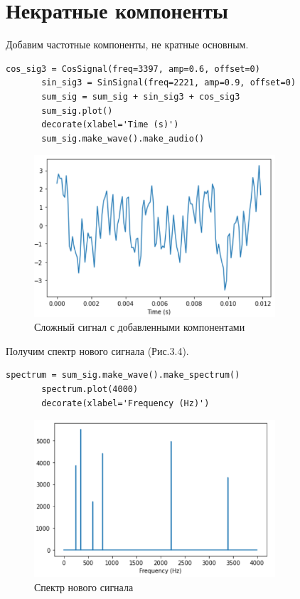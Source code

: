 \documentclass[a4paper,12pt]{report}
\begin{document}
\section{Некратные компоненты}
    Добавим частотные компоненты, не кратные основным.
\begin{lstlisting}[caption=Добавление новых компонентов]
       cos_sig3 = CosSignal(freq=3397, amp=0.6, offset=0)
       sin_sig3 = SinSignal(freq=2221, amp=0.9, offset=0)
       sum_sig = sum_sig + sin_sig3 + cos_sig3
       sum_sig.plot()
       decorate(xlabel='Time (s)')
       sum_sig.make_wave().make_audio()
\end{lstlisting}
\begin{figure}[H]
        \centering
        \includegraphics[width=0.8\textwidth]{fig3-3.PNG}
        \caption{Сложный сигнал с добавленными компонентами}
        \label{fig:fig3-3}
\end{figure}
    Получим спектр нового сигнала (Рис.3.4).
\begin{lstlisting}[caption=Вычисление спектра нового сигнала]
       spectrum = sum_sig.make_wave().make_spectrum()
       spectrum.plot(4000)
       decorate(xlabel='Frequency (Hz)')
\end{lstlisting}
\begin{figure}[H]
        \centering
        \includegraphics[width=0.8\textwidth]{fig3-4.PNG}
        \caption{Спектр нового сигнала}
        \label{fig:fig3-4}
\end{figure}   
\end{document}
